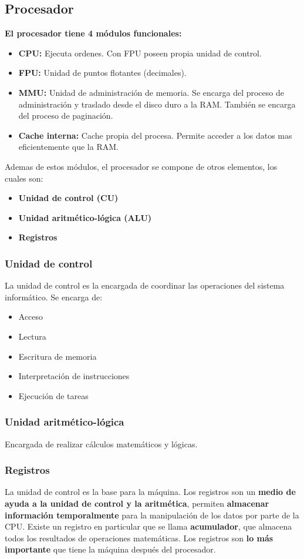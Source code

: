 \documentclass{templateNote}
\begin{document}
\subsection{Procesador}
\noindent \textbf{El procesador tiene 4 módulos funcionales:}
\begin{itemize}
    \item \textbf{CPU:} Ejecuta ordenes. Con FPU poseen propia unidad de control.
    \item \textbf{FPU:} Unidad de puntos flotantes (decimales).
    \item \textbf{MMU:} Unidad de administración de memoria. Se encarga del proceso de administración y traslado desde el disco duro a la RAM. 
                        También se encarga del proceso de paginación.
    \item \textbf{Cache interna:} Cache propia del procesa. Permite acceder a los datos mas eficientemente que la RAM.
\end{itemize}

\noindent Ademas de estos módulos, el procesador se compone de otros elementos, los cuales son:
\begin{itemize}
    \item \textbf{Unidad de control (CU)}
    \item \textbf{Unidad aritmético-lógica (ALU)}
    \item \textbf{Registros}
\end{itemize}

\subsubsection{Unidad de control}
\noindent La unidad de control es la encargada de coordinar las operaciones del sistema informático. Se encarga de:
\begin{itemize}
    \item Acceso
    \item Lectura
    \item Escritura de memoria
    \item Interpretación de instrucciones
    \item Ejecución de tareas
\end{itemize}
\subsubsection{Unidad aritmético-lógica}
\noindent Encargada de realizar cálculos matemáticos y lógicas.
\subsubsection{Registros}
\noindent La unidad de control es la base para la máquina. Los registros son un \textbf{medio de ayuda a la unidad de control y la aritmética}, 
permiten \textbf{almacenar información temporalmente} para la manipulación de los datos por parte de la CPU. Existe un registro en particular 
que se llama \textbf{acumulador}, que almacena todos los resultados de operaciones matemáticas. Los registros son \textbf{lo más importante} 
que tiene la máquina después del procesador.
\end{document}
